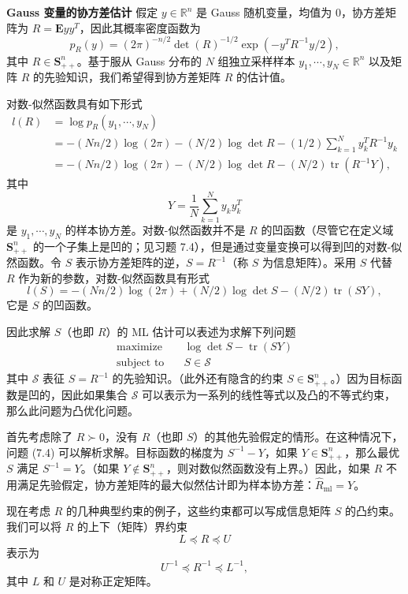 \documentclass[UTF8,12pt,a4paper,fontset=fandol]{ctexart}
\begin{document}
\noindent\textbf{Gauss 变量的协方差估计}\quad
假定 $y\in\mathbb{R}^n$ 是 Gauss 随机变量，均值为 $0$，协方差矩阵为 $R=\mathbf{E}yy^T$，因此其概率密度函数为
\[
p_R(y)=(2\pi)^{-n/2}\det(R)^{-1/2}\exp(-y^T R^{-1}y/2),
\]
其中 $R\in\mathbf{S}_{++}^n$。基于服从 Gauss 分布的 $N$ 组独立采样样本 $y_1,\cdots,y_N\in\mathbb{R}^n$ 以及矩阵 $R$ 的先验知识，我们希望得到协方差矩阵 $R$ 的估计值。

对数-似然函数具有如下形式
\[
\begin{aligned}
l(R)
&=\log p_R(y_1,\cdots,y_N)\\
&=-(Nn/2)\log(2\pi)-(N/2)\log\det R-(1/2)\sum_{k=1}^N y_k^T R^{-1}y_k\\
&=-(Nn/2)\log(2\pi)-(N/2)\log\det R-(N/2)\operatorname{tr}(R^{-1}Y),
\end{aligned}
\]
其中
\[
Y=\frac{1}{N}\sum_{k=1}^N y_ky_k^T
\]
是 $y_1,\cdots,y_N$ 的样本协方差。对数-似然函数并不是 $R$ 的凹函数（尽管它在定义域 $\mathbf{S}_{++}^n$ 的一个子集上是凹的；见习题 7.4），但是通过变量变换可以得到凹的对数-似然函数。令 $S$ 表示协方差矩阵的逆，$S=R^{-1}$（称 $S$ 为信息矩阵）。采用 $S$ 代替 $R$ 作为新的参数，对数-似然函数具有形式
\[
l(S)=-(Nn/2)\log(2\pi)+(N/2)\log\det S-(N/2)\operatorname{tr}(SY),
\]
它是 $S$ 的凹函数。

因此求解 $S$（也即 $R$）的 ML 估计可以表述为求解下列问题
\begin{equation}
\begin{aligned}
\text{maximize}\quad & \log\det S-\operatorname{tr}(SY)\\
\text{subject to}\quad & S\in\mathcal{S}
\end{aligned}
\tag{7.4}
\end{equation}
其中 $\mathcal{S}$ 表征 $S=R^{-1}$ 的先验知识。（此外还有隐含的约束 $S\in\mathbf{S}_{++}^n$。）因为目标函数是凹的，因此如果集合 $\mathcal{S}$ 可以表示为一系列的线性等式以及凸的不等式约束，那么此问题为凸优化问题。

首先考虑除了 $R\succ 0$，没有 $R$（也即 $S$）的其他先验假定的情形。在这种情况下，问题 (7.4) 可以解析求解。目标函数的梯度为 $S^{-1}-Y$，如果 $Y\in\mathbf{S}_{++}^n$，那么最优 $S$ 满足 $S^{-1}=Y$。（如果 $Y\notin\mathbf{S}_{++}^n$，则对数似然函数没有上界。）因此，如果 $R$ 不用满足先验假定，协方差矩阵的最大似然估计即为样本协方差：$\hat{R}_{\mathrm{ml}}=Y$。

现在考虑 $R$ 的几种典型约束的例子，这些约束都可以写成信息矩阵 $S$ 的凸约束。我们可以将 $R$ 的上下（矩阵）界约束
\[
L\preceq R\preceq U
\]
表示为
\[
U^{-1}\preceq R^{-1}\preceq L^{-1},
\]
其中 $L$ 和 $U$ 是对称正定矩阵。
\end{document}
